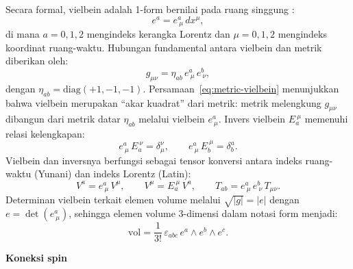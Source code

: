Secara formal, vielbein adalah 1-form bernilai pada ruang singgung \cite{eguchi1980, carroll2019spacetime}:
\begin{equation}\label{eq:vielbein}
    e^a = e^a_{\ \mu}\, dx^\mu,
\end{equation}
di mana $a = 0, 1, 2$ mengindeks kerangka Lorentz dan $\mu = 0, 1, 2$ mengindeks koordinat ruang-waktu. Hubungan fundamental antara vielbein dan metrik diberikan oleh:
\begin{equation}\label{eq:metric-vielbein}
    g_{\mu\nu} = \eta_{ab}\, e^a_{\ \mu}\, e^b_{\ \nu},
\end{equation}
dengan $\eta_{ab} = \mathrm{diag}(+1, -1, -1)$. Persamaan~\eqref{eq:metric-vielbein} menunjukkan bahwa vielbein merupakan ``akar kuadrat'' dari metrik: metrik melengkung $g_{\mu\nu}$ dibangun dari metrik datar $\eta_{ab}$ melalui vielbein $e^a_{\ \mu}$. Invers vielbein $E_a^{\ \mu}$ memenuhi relasi kelengkapan:
\begin{equation}\label{eq:vielbein-inverse}
    e^a_{\ \mu}\, E_a^{\ \nu} = \delta^\nu_\mu, \qquad e^a_{\ \mu}\, E_b^{\ \mu} = \delta^a_b.
\end{equation}
Vielbein dan inversnya berfungsi sebagai tensor konversi antara indeks ruang-waktu (Yunani) dan indeks Lorentz (Latin):
\begin{equation}\label{eq:index-conversion}
    V^a = e^a_{\ \mu}\, V^\mu, \qquad V^\mu = E_a^{\ \mu}\, V^a, \qquad T_{ab} = e^a_{\ \mu}\, e^b_{\ \nu}\, T_{\mu\nu}.
\end{equation}
Determinan vielbein terkait elemen volume melalui $\sqrt{|g|} = |e|$ dengan $e = \det(e^a_{\ \mu})$, sehingga elemen volume 3-dimensi dalam notasi form menjadi:
\begin{equation}\label{eq:vol-form}
    \mathrm{vol} = \frac{1}{3!}\, \varepsilon_{abc}\, e^a \wedge e^b \wedge e^c.
\end{equation}


\vspace{0.5em}
\noindent \textbf{Koneksi spin}

